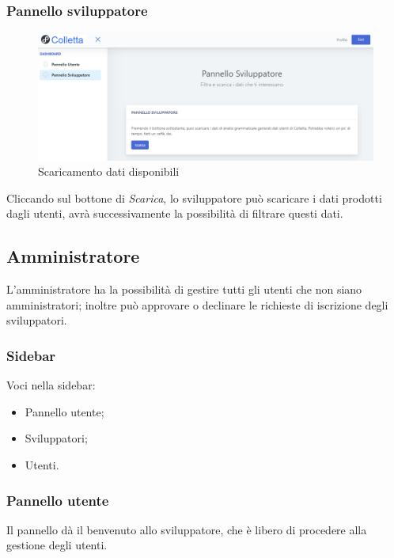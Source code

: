     	\subsubsection{Pannello sviluppatore}
    		\begin{figure}[H]
				\centering
				\includegraphics[width=17cm]{sez/img/sviluppatore/datipronti.png}
				\caption{Scaricamento dati disponibili}\label{fig:1}
			\end{figure}
		  Cliccando sul bottone di \textit{Scarica}, lo sviluppatore può scaricare i dati prodotti dagli utenti, avrà successivamente la possibilità di filtrare questi dati.




	\newpage
	\subsection{Amministratore}
	L'amministratore ha la possibilità di gestire tutti gli utenti che non siano amministratori; inoltre può approvare o declinare le richieste di iscrizione degli sviluppatori.
		\subsubsection{Sidebar}
		  Voci nella sidebar:
			\begin{itemize}
				\item Pannello utente;
				\item Sviluppatori;
				\item Utenti.
			\end{itemize}



		\subsubsection{Pannello utente}
		 Il pannello dà il benvenuto allo sviluppatore, che è libero di procedere alla gestione degli utenti.




